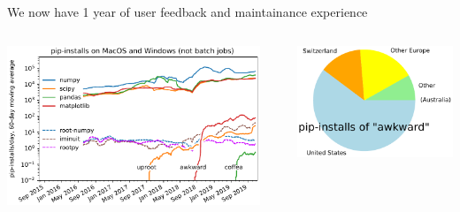 \documentclass[aspectratio=169]{beamer}
\begin{document}
\begin{frame}{We now have 1 year of user feedback and maintainance experience}
\large
\vspace{0.5 cm}

\begin{columns}
\includegraphics[width=\linewidth]{pip-timeline.pdf}

\vspace{0.1 cm}
\centering \textcolor{darkblue}{}

\hfill\includegraphics[width=0.8\linewidth]{pip-country-awkward.pdf}


\end{columns}
\end{frame}
\end{document}
